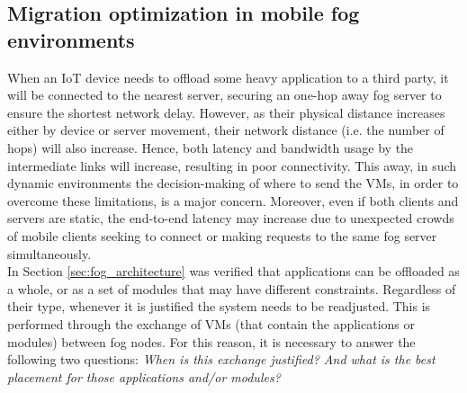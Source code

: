 \subsection{Migration optimization in mobile fog environments}
\label{sec:Migration}
When an IoT device needs to offload some heavy application to a third party, it will be connected to the nearest server, securing an one-hop away fog server to ensure the shortest network delay. However, as their physical distance increases either by device or server movement, their network distance (i.e. the number of hops) will also increase. Hence, both latency and bandwidth usage by the intermediate links will increase, resulting in poor connectivity. This away, in such dynamic environments the decision-making of where to send the VMs, in order to overcome these limitations, is a major concern. Moreover, even if both clients and servers are static, the end-to-end latency may increase due to unexpected crowds of mobile clients seeking to connect or making requests to the same fog server simultaneously.\\
\noindent\tab In Section \ref{sec:fog_architecture} was verified that applications can be offloaded as a whole, or as a set of modules that may have different constraints. Regardless of their type, whenever it is justified the system needs to be readjusted. This is performed through the exchange of VMs (that contain the applications or modules) between fog nodes. For this reason, it is necessary to answer the following two questions: \textit{When is this exchange justified? And what is the best placement for those applications and/or modules?}\\


